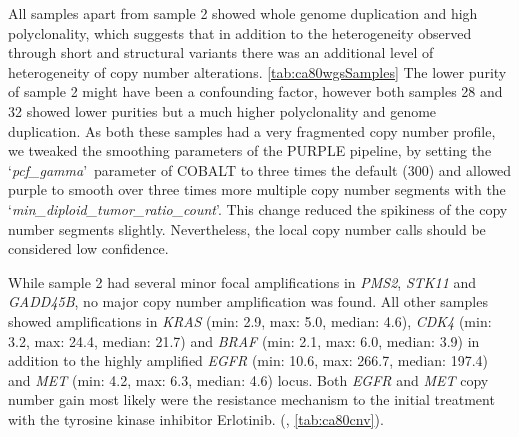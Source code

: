 All samples apart from sample 2 showed whole genome duplication and high polyclonality, which suggests that in addition to the heterogeneity observed through short and structural variants there was an additional level of heterogeneity of copy number alterations. \autoref{tab:ca80wgsSamples} The lower purity of sample 2 might have been a confounding factor, however both samples 28 and 32 showed lower purities but a much higher polyclonality and genome duplication.  As both these samples had a very fragmented copy number profile, we tweaked the smoothing parameters of the PURPLE pipeline, by setting the \lq\textit{pcf\_gamma}\rq\ parameter of COBALT to three times the default (300) and allowed purple to smooth over three times more multiple copy number segments with the \lq\textit{min\_diploid\_tumor\_ratio\_count}\rq. This change reduced the spikiness of the copy number segments slightly. Nevertheless, the local copy number calls should be considered low confidence.

While sample 2 had several minor focal amplifications in \textit{PMS2}, \textit{STK11} and \textit{GADD45B}, no major copy number amplification was found. All other samples showed amplifications in \textit{KRAS} (min: 2.9, max: 5.0, median: 4.6), \textit{CDK4} (min: 3.2, max: 24.4, median: 21.7) and \textit{BRAF} (min: 2.1, max: 6.0, median: 3.9) in addition to the highly amplified \textit{EGFR} (min: 10.6, max: 266.7, median: 197.4) and \textit{MET} (min: 4.2, max: 6.3, median: 4.6) locus. Both \textit{EGFR} and \textit{MET} copy number gain most likely were the resistance mechanism to the initial treatment with the tyrosine kinase inhibitor Erlotinib. (, \autoref{tab:ca80cnv}).


